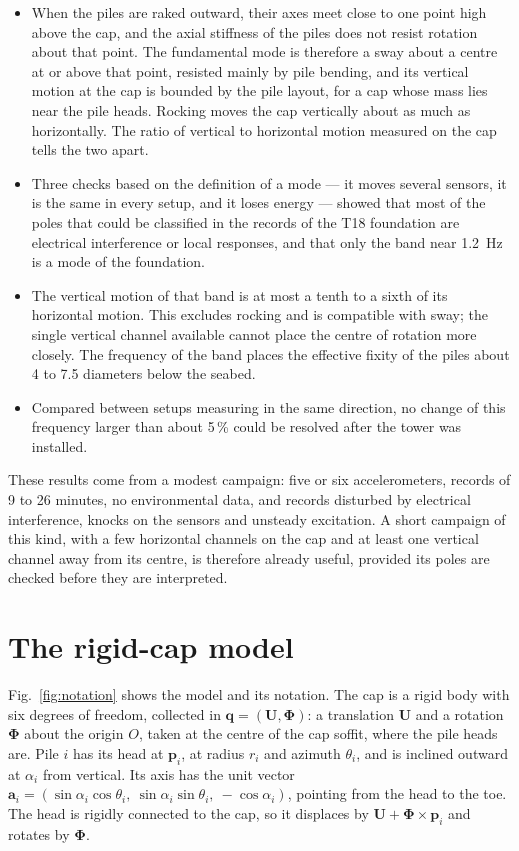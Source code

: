 \documentclass[11pt]{article}
\begin{document}
\begin{itemize}
\item When the piles are raked outward, their axes meet close to one point high above the cap, and the axial stiffness of the piles does not resist rotation about that point. The fundamental mode is therefore a sway about a centre at or above that point, resisted mainly by pile bending, and its vertical motion at the cap is bounded by the pile layout, for a cap whose mass lies near the pile heads. Rocking moves the cap vertically about as much as horizontally. The ratio of vertical to horizontal motion measured on the cap tells the two apart.
\item Three checks based on the definition of a mode --- it moves several sensors, it is the same in every setup, and it loses energy --- showed that most of the poles that could be classified in the records of the T18 foundation are electrical interference or local responses, and that only the band near 1.2~Hz is a mode of the foundation.
\item The vertical motion of that band is at most a tenth to a sixth of its horizontal motion. This excludes rocking and is compatible with sway; the single vertical channel available cannot place the centre of rotation more closely. The frequency of the band places the effective fixity of the piles about 4 to 7.5 diameters below the seabed.
\item Compared between setups measuring in the same direction, no change of this frequency larger than about 5\,\% could be resolved after the tower was installed.
\end{itemize}

These results come from a modest campaign: five or six accelerometers, records of 9 to 26 minutes, no environmental data, and records disturbed by electrical interference, knocks on the sensors and unsteady excitation. A short campaign of this kind, with a few horizontal channels on the cap and at least one vertical channel away from its centre, is therefore already useful, provided its poles are checked before they are interpreted.

\appendix
{}

\section{The rigid-cap model}
\label{app:model}

Fig.~\ref{fig:notation} shows the model and its notation. The cap is a rigid body with six degrees of freedom, collected in $\mathbf{q} = (\mathbf{U}, \boldsymbol{\Phi})$: a translation $\mathbf{U}$ and a rotation $\boldsymbol{\Phi}$ about the origin $O$, taken at the centre of the cap soffit, where the pile heads are. Pile $i$ has its head at $\mathbf{p}_i$, at radius $r_i$ and azimuth $\theta_i$, and is inclined outward at $\alpha_i$ from vertical. Its axis has the unit vector $\mathbf{a}_i = (\sin\alpha_i\cos\theta_i,\ \sin\alpha_i\sin\theta_i,\ -\cos\alpha_i)$, pointing from the head to the toe. The head is rigidly connected to the cap, so it displaces by $\mathbf{U} + \boldsymbol{\Phi}\times\mathbf{p}_i$ and rotates by $\boldsymbol{\Phi}$.
\end{document}
